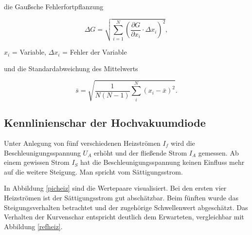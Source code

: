 die Gaußsche Fehlerfortpflanzung

\begin{formel}
\begin{equation}
\Delta G = \sqrt{\sum_{i=1}^{N}\left( \frac{\partial G}{\partial x_i}\cdot \Delta x_i\right)^2},
\label{gauss}
\end{equation}
\caption*{$x_i$ = Variable, $\Delta x_i$ = Fehler der Variable}
\end{formel}

und die Standardabweichung des Mittelwerts

\begin{equation}
 \bar s = \sqrt{\frac{1}{N(N-1)} \sum_{i}^{N} (x_i - \bar{x})^2}.
\end{equation}

\subsection{Kennlinienschar der Hochvakuumdiode}
\label{a}
Unter Anlegung von fünf verschiedenen Heizströmen $I_f$ wird die Beschleunigungsspannung $U_A$ erhöht und der fließende Strom $I_A$ 
gemessen. Ab einem gewissen Strom $I_S$ hat die Beschleunigungsspannung keinen Einfluss mehr auf die weitere Steigung. Man spricht vom
Sättigungsstrom.

In Abbildung \ref{picheiz} sind die Wertepaare visualisiert. Bei den ersten vier Heizströmen ist der Sättigungsstrom gut abschätzbar.
Beim fünften wurde das Steigungsverhalten betrachtet und der zugehörige Schwellenwert abgeschätzt. Das Verhalten der Kurvenschar 
entspricht deutlich dem Erwarteten, vergleichbar mit Abbildung \ref{refheiz}.

